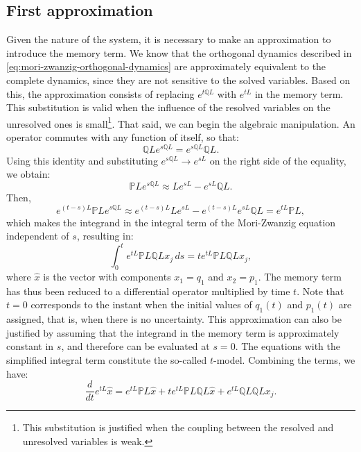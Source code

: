 \documentclass[12pt]{article}
\begin{document}
\subsection{First approximation}
Given the nature of the system, it is necessary to make an approximation to introduce the memory term. We know that the orthogonal dynamics described in \eqref{eq:mori-zwanzig-orthogonal-dynamics} are approximately equivalent to the complete dynamics, since they are not sensitive to the solved variables. Based on this, the approximation consists of replacing $e^{t\mathbb{Q}L}$ with $e^{tL}$ in the memory term. This substitution is valid when the influence of the resolved variables on the unresolved ones is small\footnote{This substitution is justified when the coupling between the resolved and unresolved variables is weak.}. 
That said, we can begin the algebraic manipulation. An operator commutes with any function of itself, so that:
\begin{equation*}
\mathbb{Q}Le^{s\mathbb{Q}L} = e^{s\mathbb{Q}L} \mathbb{Q}L.
\end{equation*}
Using this identity and substituting $e^{s\mathbb{Q}L} \to e^{sL}$ on the right side of the equality, we obtain:
\begin{equation*}
    \mathbb{P}Le^{s\mathbb{Q}L} \approx Le^{sL} - e^{sL} \mathbb{Q}L.
\end{equation*}
Then,
\begin{equation*}
    e^{(t-s)L} \mathbb{P}Le^{s\mathbb{Q}L} \approx e^{(t-s)L} Le^{sL} - e^{(t-s)L} e^{sL} \mathbb{Q}L = e^{tL} \mathbb{P}L,
\end{equation*}
which makes the integrand in the integral term of the Mori-Zwanzig equation independent of $s$, resulting in:
\begin{equation*}
    \int_0^t e^{tL} \mathbb{P}L \mathbb{Q}L x_j \, ds = t e^{tL} \mathbb{P}L \mathbb{Q}L x_j,
\end{equation*}
where $\hat{x}$ is the vector with components $x_1 = q_1$ and $x_2 = p_1$. The memory term has thus been reduced to a differential operator multiplied by time $t$. Note that $t = 0$ corresponds to the instant when the initial values of $q_1(t)$ and $p_1(t)$ are assigned, that is, when there is no uncertainty. This approximation can also be justified by assuming that the integrand in the memory term is approximately constant in $s$, and therefore can be evaluated at $s = 0$.
The equations with the simplified integral term constitute the so-called $t$-model. Combining the terms, we have:
\begin{equation*}
    
\frac{d}{dt} e^{tL} \hat{x} = e^{tL} \mathbb{P}L \hat{x} + t e^{tL} \mathbb{P}L \mathbb{Q}L \hat{x} + e^{tL} \mathbb{Q}L \mathbb{Q}L x_j.
\end{equation*}
\end{document}

